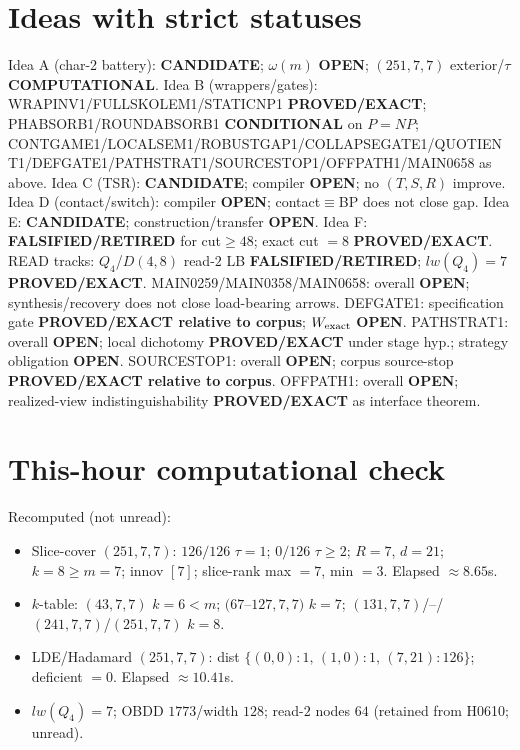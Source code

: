 \documentclass[11pt]{article}
\begin{document}
\section*{Ideas with strict statuses}
Idea A (char-2 battery): \textbf{CANDIDATE}; $\omega(m)$ \textbf{OPEN}; $(251,7,7)$ exterior/$\tau$ \textbf{COMPUTATIONAL}.
Idea B (wrappers/gates): WRAPINV1/FULLSKOLEM1/STATICNP1 \textbf{PROVED/EXACT};
PHABSORB1/ROUNDABSORB1 \textbf{CONDITIONAL} on $P=NP$;
CONTGAME1/LOCALSEM1/ROBUSTGAP1/COLLAPSEGATE1/QUOTIENT1/DEFGATE1/PATHSTRAT1/SOURCESTOP1/OFFPATH1/MAIN0658 as above.
Idea C (TSR): \textbf{CANDIDATE}; compiler \textbf{OPEN}; no $(T,S,R)$ improve.
Idea D (contact/switch): compiler \textbf{OPEN}; contact$\equiv$BP does not close gap.
Idea E: \textbf{CANDIDATE}; construction/transfer \textbf{OPEN}.
Idea F: \textbf{FALSIFIED/RETIRED} for cut$\ge48$; exact cut $=8$ \textbf{PROVED/EXACT}.
READ tracks: $Q_4$/$D(4,8)$ read-$2$ LB \textbf{FALSIFIED/RETIRED}; $lw(Q_4)=7$ \textbf{PROVED/EXACT}.
MAIN0259/MAIN0358/MAIN0658: overall \textbf{OPEN}; synthesis/recovery does not close load-bearing arrows.
DEFGATE1: specification gate \textbf{PROVED/EXACT relative to corpus}; $W_{\rm exact}$ \textbf{OPEN}.
PATHSTRAT1: overall \textbf{OPEN}; local dichotomy \textbf{PROVED/EXACT} under stage hyp.; strategy obligation \textbf{OPEN}.
SOURCESTOP1: overall \textbf{OPEN}; corpus source-stop \textbf{PROVED/EXACT relative to corpus}.
OFFPATH1: overall \textbf{OPEN}; realized-view indistinguishability \textbf{PROVED/EXACT} as interface theorem.

\section*{This-hour computational check}
Recomputed (not unread):
\begin{itemize}
\item Slice-cover $(251,7,7)$: $126/126$ $\tau{=}1$; $0/126$ $\tau{\ge}2$; $R{=}7$, $d{=}21$;
  $k{=}8{\ge}m{=}7$; innov $[7]$; slice-rank max $=7$, min $=3$. Elapsed $\approx8.65$s.
\item $k$-table: $(43,7,7)$ $k{=}6{<}m$; $(67$--$127,7,7)$ $k{=}7$;
  $(131,7,7)$/--/$(241,7,7)$/$(251,7,7)$ $k{=}8$.
\item LDE/Hadamard $(251,7,7)$: dist $\{(0,0){:}1,\,(1,0){:}1,\,(7,21){:}126\}$; deficient $=0$. Elapsed $\approx10.41$s.
\item $lw(Q_4)=7$; OBDD $1773$/width $128$; read-$2$ nodes $64$ (retained from H0610; unread).
\end{itemize}
\end{document}
